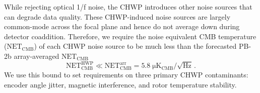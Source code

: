 While rejecting optical 1/f noise, the CHWP introduces other noise sources that can degrade data quality. These CHWP-induced noise sources are largely common-mode across the focal plane and hence do not average down during detector coaddition. Therefore, we require the noise equivalent CMB temperature ($\mathrm{NET_{CMB}}$) of each CHWP noise source to be much less than the forecasted PB-2b array-averaged $\mathrm{NET_{CMB}}$ \cite{suzuki_polarbear-2_2016}
\begin{equation}
    \mathrm{NET_{CMB}^{HWP}} \ll \mathrm{NET_{CMB}^{arr}} = 5.8 \; \mathrm{\mu K_{CMB} / \sqrt{Hz}} \, .
    \label{eq:arr_noise}
\end{equation}
\noindent
We use this bound to set requirements on three primary CHWP contaminants: encoder angle jitter, magnetic interference, and rotor temperature stability.

